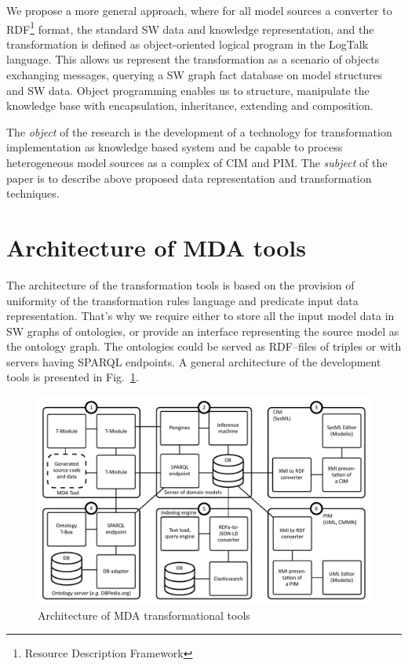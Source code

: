\documentclass[conference]{IEEEtran} \IEEEoverridecommandlockouts
\begin{document}
We propose a more general approach, where for all model sources a converter to RDF\footnote{Resource Description Framework} format, the standard SW data and knowledge representation, and the transformation is defined as object-oriented logical program in the LogTalk language. This allows us represent the transformation as a scenario of objects exchanging messages, querying a SW graph fact database on model structures and SW data. Object programming enables us to structure, manipulate the knowledge base with encapsulation, inheritance, extending and composition. 

The \emph{object} of the research is the development of a technology for transformation implementation as knowledge based system and be capable to process heterogeneous model sources as a complex of CIM and PIM. The \emph{subject} of the paper is to describe above proposed data representation and transformation techniques. 

\section{Architecture of MDA tools} 

The architecture of the transformation tools is based on the provision of uniformity of the transformation rules language and predicate input data representation. That's why we require either to store all the input model data in SW graphs of ontologies, or provide an interface representing the source model as the ontology graph. The ontologies could be served as RDF--files of triples or with servers having SPARQL endpoints. A general architecture of the development tools is presented in Fig.~\ref{fig:archi}. 

\begin{figure}[htb] \centering

\includegraphics[width=1\linewidth]{pics/architecture-mda-lod-ext.pdf} \caption{Architecture of MDA transformational tools} \label{fig:archi} \end{figure} 
\end{document}
